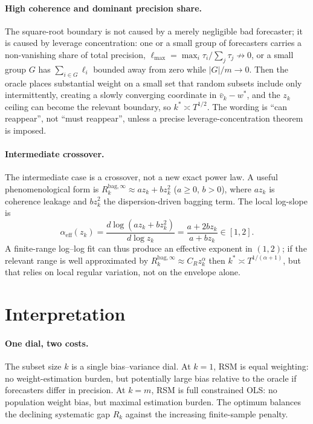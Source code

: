 \documentclass[11pt]{article}
\newcommand{\Rbag}{R_k^{\mathrm{bag},\infty}}
\begin{document}
\paragraph{High coherence and dominant precision share.} The square-root boundary is not
caused by a merely negligible bad forecaster; it is caused by leverage concentration: one or a
small group of forecasters carries a non-vanishing share of total precision, $\ell_{\max}=
\max_i\tau_i/\sum_j\tau_j\not\to0$, or a small group $G$ has $\sum_{i\in G}\ell_i$ bounded away
from zero while $|G|/m\to0$. Then the oracle places substantial weight on a small set that
random subsets include only intermittently, creating a slowly converging coordinate in
$\bar v_k-w^\ast$, and the $z_k$ ceiling can become the relevant boundary, so $k^\ast\asymp
T^{1/2}$. The wording is ``can reappear'', not ``must reappear'', unless a precise
leverage-concentration theorem is imposed.

\paragraph{Intermediate crossover.} The intermediate case is a crossover, not a new exact
power law. A useful phenomenological form is $\Rbag\approx az_k+bz_k^2$ ($a\ge0$, $b>0$),
where $az_k$ is coherence leakage and $bz_k^2$ the dispersion-driven bagging term. The local
log-slope is
\[
  \alpha_{\mathrm{eff}}(z_k)=\frac{d\log(az_k+bz_k^2)}{d\log z_k}=\frac{a+2bz_k}{a+bz_k}\in[1,2].
\]
A finite-range log--log fit can thus produce an effective exponent in $(1,2)$; if the relevant
range is well approximated by $\Rbag\approx C_Rz_k^\alpha$ then $k^\ast\asymp T^{1/(\alpha+1)}$,
but that relies on local regular variation, not on the envelope alone.

\section{Interpretation}
\paragraph{One dial, two costs.} The subset size $k$ is a single bias--variance dial. At
$k=1$, RSM is equal weighting: no weight-estimation burden, but potentially large bias
relative to the oracle if forecasters differ in precision. At $k=m$, RSM is full constrained
OLS: no population weight bias, but maximal estimation burden. The optimum balances the
declining systematic gap $R_k$ against the increasing finite-sample penalty.
\end{document}
